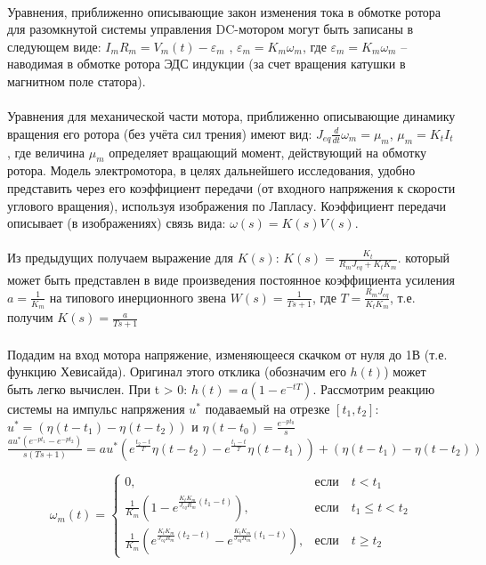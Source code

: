 \documentclass[12pt]{article}
\begin{document}
\paragraph{}
Уравнения, приближенно описывающие закон изменения
тока в обмотке ротора для разомкнутой системы управления
DC-мотором могут быть записаны в следующем виде:
$I_m R_m =V_m(t)-\varepsilon_m$ , $\varepsilon_m = K_m\omega_m$,
где $\varepsilon_m = K_m\omega_m$ – наводимая в обмотке ротора ЭДС индукции
(за счет вращения катушки в магнитном поле статора).
\paragraph{}
Уравнения для механической части мотора,
приближенно описывающие динамику вращения его ротора
(без учёта сил трения) имеют вид: 
$J_{eq}\frac{d}{dt}\omega_m =\mu_m$, $\mu_m = K_t I_t$,
где величина $\mu_m$ определяет вращающий момент,
действующий на обмотку ротора.\hfill\break
Модель электромотора, в целях дальнейшего исследования,
удобно представить через его коэффициент передачи (от входного 
напряжения к скорости углового вращения), используя изображения по Лапласу.
Коэффициент передачи описывает (в изображениях) связь вида: $\omega(s) = K(s)V(s)$.

\paragraph{}
Из предыдущих получаем выражение для $K(s)$: $K(s) = \frac{K_t}{R_mJ_{eq}+K_tK_m}$. который может быть представлен в виде
произведения постоянное коэффициента усиления $a = \frac{1}{K_m}$ на типового инерционного звена $W(s) = \frac{1}{Ts+1}$, где $T = \frac{R_mJ_{eq}}{K_tK_m}$, т.е. получим $K(s) = \frac{a}{Ts+1}$

\paragraph{}
Подадим на вход мотора напряжение, изменяющееся
скачком от нуля до 1В (т.е. функцию Хевисайда). Оригинал
этого отклика (обозначим его $h(t)$) может быть легко
вычислен. При t > 0: 
$h(t) = a(1 - e^{-tT})$.
Рассмотрим реакцию системы на импульс напряжения $u^*$
подаваемый на отрезке $[t_1 , t_2 ]$:
$u^* = (\eta(t - t_1) - \eta(t - t_2))$ и
$\eta(t-t_0) = \frac{e^{-pt_0}}{s}$\hfill\break
$\frac{au^*(e^{-pt_1} - e^{-pt_2})}{s(Ts+1)} = 
au^*(e^{\frac{t_2 - t}{T}}\eta(t - t_2) - 
     e^{\frac{t_1 - t}{T}}\eta(t - t_1))+ 
(\eta(t - t_1) - \eta(t - t_2))$

\[
\omega_m(t) = 
\begin{cases}
  0,  & \textit{если}\quad t < t_1\\
  \frac{1}{K_m}(1 - e^{\frac{K_tK_m}{J_{eq}R_m}(t_1 - t)}), & \textit{если}\quad t_1 \leqslant  t < t_2 \\
  \frac{1}{K_m}(e^{\frac{K_tK_m}{J_{eq}R_m}(t_2 - t)} - e^{\frac{K_tK_m}{J_{eq}R_m}(t_1 - t)}), & \textit{если}\quad t \geqslant  t_2
\end{cases}
\]
\end{document}
